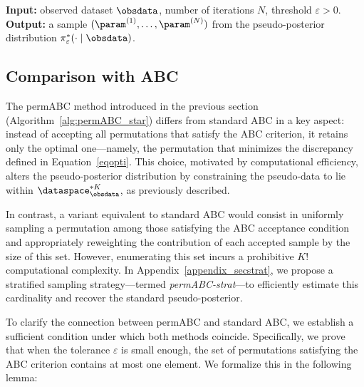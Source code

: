 \begin{algorithm}
\caption{permABC Vanilla}\label{alg:permABC_star}
\textbf{Input: }observed dataset $\obsdata$, number of iterations $N$, threshold $\varepsilon>0$.\\
\textbf{Output: }a sample $(\param^{(1)}, \dots, \param^{(N)})$ from the pseudo-posterior distribution $\pi_{\varepsilon}^*(\cdot\mid \obsdata)$.\\

\BlankLine

\end{algorithm}

\subsection{Comparison with ABC}
\label{sec:comparison}

The permABC method introduced in the previous section (Algorithm~\ref{alg:permABC_star}) differs from standard ABC in a key aspect: instead of accepting all permutations that satisfy the ABC criterion, it retains only the optimal one—namely, the permutation that minimizes the discrepancy defined in Equation~\eqref{eqopti}. This choice, motivated by computational efficiency, alters the pseudo-posterior distribution by constraining the pseudo-data to lie within $\dataspace^{*K}_{\obsdata}$, as previously described.


In contrast, a variant equivalent to standard ABC would consist in uniformly sampling a permutation among those satisfying the ABC acceptance condition and appropriately reweighting the contribution of each accepted sample by the size of this set. However, enumerating this set incurs a prohibitive $K!$ computational complexity. In Appendix~\ref{appendix_secstrat}, we propose a stratified sampling strategy—termed \emph{permABC-strat}—to efficiently estimate this cardinality and recover the standard pseudo-posterior.

To clarify the connection between permABC and standard ABC, we establish a sufficient condition under which both methods coincide. Specifically, we prove that when the tolerance $\varepsilon$ is small enough, the set of permutations satisfying the ABC criterion contains at most one element. We formalize this in the following lemma:

